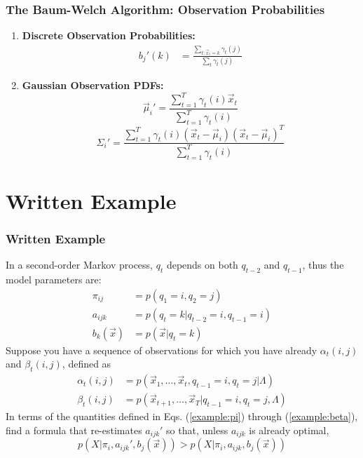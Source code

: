 \documentclass{beamer}
\begin{document}
\begin{frame}
  \frametitle{The Baum-Welch Algorithm: Observation Probabilities}
  \begin{enumerate}
  \item {\bf Discrete Observation Probabilities:}
    \begin{align*}
      b_{j}'(k) &=\frac{\sum_{t:\vec{x}_t=k} \gamma_t(j)}{\sum_{t}\gamma_t(j)}
    \end{align*}
  \item {\bf Gaussian Observation PDFs:}
    \begin{displaymath}
      \vec\mu_{i}' = \frac{\sum_{t=1}^T\gamma_t(i)\vec{x}_{t}}{\sum_{t=1}^T\gamma_t(i)}
    \end{displaymath}
    \begin{displaymath}
      \Sigma_{i}' = \frac{\sum_{t=1}^T\gamma_t(i)(\vec{x}_{t}-\vec\mu_{i})(\vec{x}_t-\vec\mu_i)^T}{\sum_{t=1}^T\gamma_t(i)}
    \end{displaymath}
  \end{enumerate}
\end{frame}

\section[Example]{Written Example}
\setcounter{subsection}{1}

\begin{frame}
  \frametitle{Written Example}

  In a second-order Markov process, $q_t$ depends on both $q_{t-2}$ and
  $q_{t-1}$, thus the model parameters are:
  \begin{align}
    \pi_{ij} &= p(q_1=i,q_2=j)\label{example:pi}\\
    a_{ijk} &= p(q_t=k|q_{t-2}=i,q_{t-1}=i)\\
    b_k(\vec{x}) &= p(\vec{x}|q_t=k)
  \end{align}
  Suppose you have a sequence of observations for which you have
  already $\alpha_t(i,j)$ and $\beta_t(i,j)$, defined as
  \begin{align}
    \alpha_t(i,j) &= p(\vec{x}_1,\ldots,\vec{x}_t,q_{t-1}=i,q_t=j|\Lambda)\\
    \beta_t(i,j) &= p(\vec{x}_{t+1},\ldots,\vec{x}_T|q_{t-1}=i,q_t=j,\Lambda)\label{example:beta}
  \end{align}
  In terms of the quantities defined in Eqs. (\ref{example:pi})
  through (\ref{example:beta}), find a formula that re-estimates
  $a_{ijk}'$ so that, unless $a_{ijk}$ is already optimal, 
  \[
  p(X|\pi_i,a_{ijk}',b_j(\vec{x})) > p(X|\pi_i,a_{ijk},b_j(\vec{x}))
  \]
\end{frame}
\end{document}
